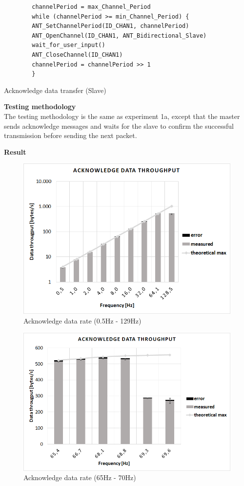 \begin{description}
	\begin{code}[H]
		\begin{verbatim}
		channelPeriod = max_Channel_Period
		while (channelPeriod >= min_Channel_Period) {
		ANT_SetChannelPeriod(ID_CHAN1, channelPeriod)
		ANT_OpenChannel(ID_CHAN1, ANT_Bidirectional_Slave)
		wait_for_user_input()
		ANT_CloseChannel(ID_CHAN1)
		channelPeriod = channelPeriod >> 1
		}
		\end{verbatim}
		\caption{Acknowledge data transfer (Slave)}\label{lst:sExp4}
	\end{code}
	\item{\textbf{Testing methodology}} \hfill \\ The testing methodology is the same as experiment 1a, except that the master sends acknowledge messages and waits for the slave to confirm the successful transmission before sending the next packet. 
	\item{\textbf{Result}} \hfill \\
	\begin{figure}[H]
		\centering
		\includegraphics[scale=0.5]{content/images/exp4_norm.png}
		\caption{Acknowledge data rate (0.5Hz - 129Hz)}\label{fig:exp4norm}
	\end{figure}
	\begin{figure}[H]
		\centering
		\includegraphics[scale=0.5]{content/images/exp4_detail.png}
		\caption{Acknowledge data rate (65Hz - 70Hz)}\label{fig:exp4between}
	\end{figure}
	

\end{description}
